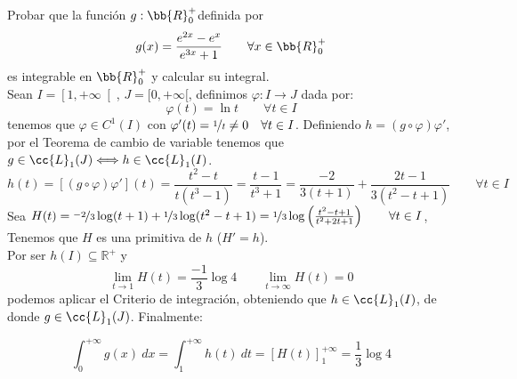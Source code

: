 \begin{ejercicio} Probar que la función $g:\bb{R}_0^+$definida por
    \begin{equation*}
        g(x) = \frac{e^{2x}-e^x}{e^{3x}+1}
        \qquad \forall x\in \bb{R}_0^+
    \end{equation*}
    es integrable en $\bb{R}_0^+$ y calcular su integral.\\

    Sean $I=\left[1,+\infty\right[$, $J=[0,+\infty[$, definimos $\varphi:I\longrightarrow J$ dada por:
        \begin{equation*}
            \varphi(t) = \ln t \qquad \forall t\in I
        \end{equation*}
        tenemos que $\varphi \in C^1(I)$ con $\varphi'(t) = \nicefrac{1}{t}\neq 0 \quad \forall t\in I$. Definiendo $h=(g\circ \varphi)\varphi'$, por el Teorema de cambio de variable tenemos que $g\in \cc{L}_1(J)\Longleftrightarrow h\in \cc{L}_1(I)$.
        \begin{equation*}
            h(t) = [(g\circ \varphi)\varphi'](t) = \dfrac{t^2-t}{t(t^3-1)} = \dfrac{t-1}{t^3 + 1} = \dfrac{-2}{3(t+1)} + \dfrac{2t-1}{3(t^2-t+1)}\qquad \forall t\in I
        \end{equation*}
        Sea $H(t) = \nicefrac{-2}{3}\log(t+1)+\nicefrac{1}{3}\log(t^2-t+1) = \nicefrac{1}{3}\log\left(\frac{t^2-t+1}{t^2+2t+1}\right)\qquad \forall t\in I$, Tenemos que $H$ es una primitiva de $h$ ($H'=h$).\\

        Por ser $h(I) \subseteq \mathbb{R}^+$ y 
        \begin{equation*}
            \lim_{t\to1}H(t) = \frac{-1}{3}\log4 \qquad \lim_{t\to\infty}H(t) = 0
        \end{equation*}
        podemos aplicar el Criterio de integración, obteniendo que $h\in \cc{L}_1(I)$, de donde $g\in \cc{L}_1(J)$. Finalmente:

        \begin{equation*}
            \displaystyle\int_{0}^{+\infty} g(x)~dx = \displaystyle\int_{1}^{+\infty} h(t)~dt = \left[H(t)\right]_1^{+\infty} = \frac{1}{3}\log4
        \end{equation*}
\end{ejercicio}
